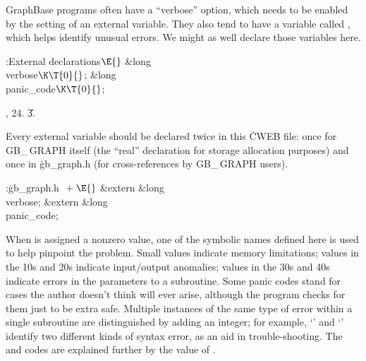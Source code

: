 GraphBase programs often have a ``verbose'' option, which needs to
be enabled by the setting of an external variable. They also tend to have
a variable called , which helps identify unusual errors.
We might as well declare those variables here.

\Y\B\4:External declarations\X${}\E{}$\6
\&{long} \\{verbose}${}\K\T{0}{}$;\6
\&{long} \\{panic\_code}${}\K\T{0}{}$;\par
{}, 24.
\U3.\fi

Every external variable should be declared twice in this \.{CWEB}
file: once for {\sc GB\_\,GRAPH} itself (the ``real'' declaration for
storage allocation purposes) and once in \.{gb\_graph.h} (for
cross-references by {\sc GB\_\,GRAPH} users).

\Y\B\4:\.{gb\_graph.h }\X${}\mathrel+\E{}$\6
\&{extern} \&{long} \\{verbose};\6
\&{extern} \&{long} \\{panic\_code};%
\par
\fi

When  is assigned a nonzero value, one of the symbolic
names defined here is used to help pinpoint the problem.
Small values indicate memory limitations; values in the 10s and 20s
indicate input/output anomalies; values in the 30s and 40s indicate
errors in the parameters to a subroutine. Some panic codes
stand for cases the author doesn't think will ever arise, although
the program checks for them just to be extra safe. Multiple instances
of the same type of error within a single subroutine are distinguished
by adding an integer; for example, `' and `'
identify two different kinds of syntax error, as an aid in trouble-shooting.
The  and  codes are
explained further
by the value of .

